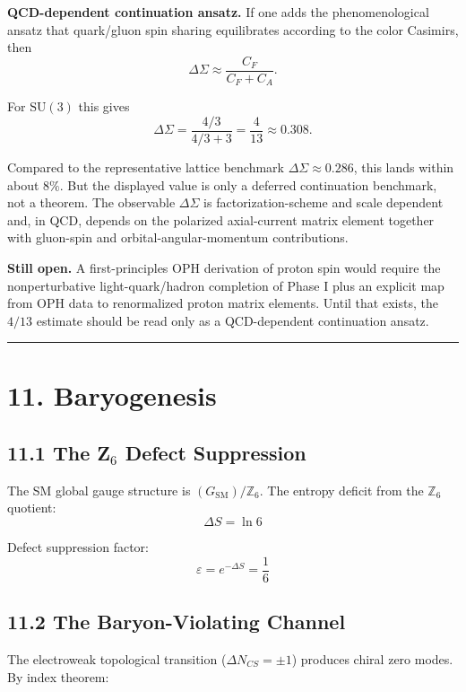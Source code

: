 \textbf{QCD-dependent continuation ansatz.} If one adds the phenomenological ansatz that quark/gluon spin sharing equilibrates according to the color Casimirs, then
\[
\Delta\Sigma \approx \frac{C_F}{C_F + C_A}.
\]

For \(\mathrm{SU}(3)\) this gives
\[
\Delta\Sigma = \frac{4/3}{4/3 + 3} = \frac{4}{13} \approx 0.308.
\]

Compared to the representative lattice benchmark \(\Delta\Sigma \approx 0.286\), this lands within about \(8\%\). But the displayed value is only a deferred continuation benchmark, not a theorem. The observable \(\Delta\Sigma\) is factorization-scheme and scale dependent and, in QCD, depends on the polarized axial-current matrix element together with gluon-spin and orbital-angular-momentum contributions.

\textbf{Still open.} A first-principles OPH derivation of proton spin would require the nonperturbative light-quark/hadron completion of Phase I plus an explicit map from OPH data to renormalized proton matrix elements. Until that exists, the \(4/13\) estimate should be read only as a QCD-dependent continuation ansatz.

\begin{center}\rule{0.5\linewidth}{0.5pt}\end{center}

\section{11. Baryogenesis}\label{11-baryogenesis}

\subsection{11.1 The Z$_6$ Defect Suppression}\label{111-the-zux2086-defect-suppression}

The SM global gauge structure is \((G_{\text{SM}})/\mathbb{Z}_6\). The entropy deficit from the \(\mathbb{Z}_6\) quotient: \[\Delta S = \ln 6\]

Defect suppression factor: \[\varepsilon = e^{-\Delta S} = \frac{1}{6}\]

\subsection{11.2 The Baryon-Violating Channel}\label{112-the-baryon-violating-channel}

The electroweak topological transition (\(\Delta N_{CS} = \pm 1\)) produces chiral zero modes. By index theorem:


